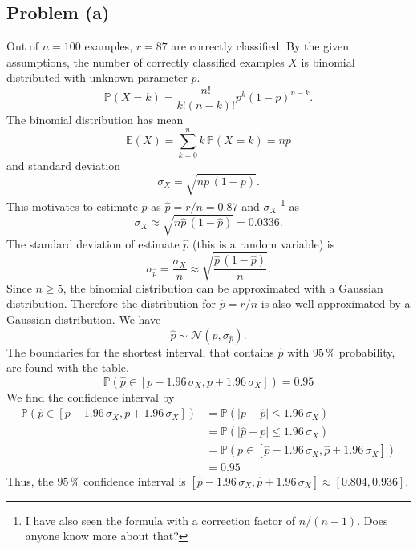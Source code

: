 \subsection*{Problem (a)}

Out of $n=100$ examples, $r=87$ are correctly classified. By the
given assumptions, the number of correctly classified examples $X$
is binomial distributed with unknown parameter $p$.
\[
\mathbb{P}(X=k)=\frac{n!}{k!(n-k)!}p^{k}(1-p)^{n-k}.
\]
The binomial distribution has mean
\[
\mathbb{E}(X)=\sum_{k=0}^{n}k\,\mathbb{P}(X=k)=np
\]
and standard deviation 
\[
\sigma_{X}=\sqrt{np\,(1-p)}.
\]
This motivates to estimate $p$ as $\hat{p}=r/n=0.87$ and $\sigma_{X}$%
\footnote{I have also seen the formula with a correction factor of $n/(n-1)$.
Does anyone know more about that?%
} as 
\[
\sigma_{X}\approx\sqrt{n\hat{p}\,(1-\hat{p})}=0.0336.
\]
 The standard deviation of estimate $\hat{p}$ (this is a random variable)
is
\[
\sigma_{\hat{p}}=\frac{\sigma_{X}}{n}\approx\sqrt{\frac{\hat{p}\,(1-\hat{p})}{n}}.
\]
Since $n\geq5$, the binomial distribution can be approximated with
a Gaussian distribution. Therefore the distribution for $\hat{p}=r/n$
is also well approximated by a Gaussian distribution. We have
\[
\hat{p}\sim\mathcal{N}(p,\sigma_{\hat{p}}).
\]
The boundaries for the shortest interval, that contains $\hat{p}$
with $95\,\%$ probability, are found with the table.
\[
\mathbb{P}\left(\hat{p}\in\left[p-1.96\,\sigma_{X},p+1.96\,\sigma_{X}\right]\right)=0.95
\]
We find the confidence interval by 
\begin{align*}
\mathbb{P}\left(\hat{p}\in\left[p-1.96\,\sigma_{X},p+1.96\,\sigma_{X}\right]\right) & =\mathbb{P}\left(\vert p-\hat{p}\vert\leq1.96\,\sigma_{X}\right)\\
 & =\mathbb{P}\left(\vert\hat{p}-p\vert\leq1.96\,\sigma_{X}\right)\\
 & =\mathbb{P}\left(p\in\left[\hat{p}-1.96\,\sigma_{X},\hat{p}+1.96\,\sigma_{X}\right]\right)\\
 & =0.95
\end{align*}
Thus, the $95\,\%$ confidence interval is $\left[\hat{p}-1.96\,\sigma_{X},\hat{p}+1.96\,\sigma_{X}\right]\approx\left[0.804,0.936\right]$.